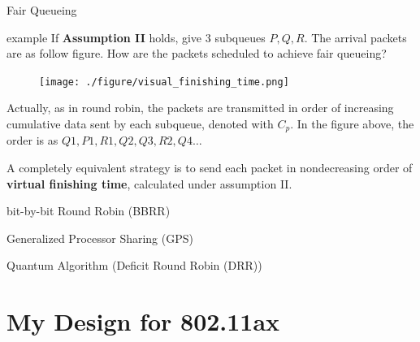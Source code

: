 \documentclass[10pt]{beamer}
\begin{document}
\begin{frame}{Fair Queueing}
\begin{exampleblock}{example}
If \textbf{Assumption II} holds, give 3 subqueues $P,Q,R$. 
The arrival packets are as follow figure.
How are the packets scheduled to achieve fair queueing?
\end{exampleblock}
\begin{figure}
\texttt{[image: ./figure/visual\_finishing\_time.png]}
\end{figure}

Actually, as in round robin, the packets are transmitted in order of increasing cumulative data sent by each subqueue, denoted with $C_p$. 
In the figure above, the order is as $Q1,P1,R1,Q2,Q3,R2,Q4\ldots$

A completely equivalent strategy is to send each packet in nondecreasing order of \textbf{virtual finishing time}, calculated under assumption II.
\end{frame}

\begin{frame}{bit-by-bit Round Robin (BBRR)}

\end{frame}

\begin{frame}{Generalized Processor Sharing (GPS)}

\end{frame}

\begin{frame}{Quantum Algorithm (Deficit Round Robin (DRR))}

\end{frame}

\section{My Design for 802.11ax}
%    
%    

\end{document}
